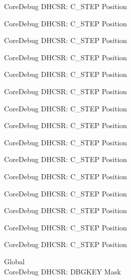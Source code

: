 \begin{DoxyRefList}
\label{deprecated__deprecated000123}%
%
Core\+Debug DHCSR\+: C\+\_\+\+STEP Position 

\label{deprecated__deprecated000179}%
%
Core\+Debug DHCSR\+: C\+\_\+\+STEP Position 

\label{deprecated__deprecated000262}%
%
Core\+Debug DHCSR\+: C\+\_\+\+STEP Position 

\label{deprecated__deprecated000321}%
%
Core\+Debug DHCSR\+: C\+\_\+\+STEP Position 

\label{deprecated__deprecated000397}%
%
Core\+Debug DHCSR\+: C\+\_\+\+STEP Position 

\label{deprecated__deprecated000486}%
%
Core\+Debug DHCSR\+: C\+\_\+\+STEP Position 

\label{deprecated__deprecated000588}%
%
Core\+Debug DHCSR\+: C\+\_\+\+STEP Position 

\label{deprecated__deprecated000713}%
%
Core\+Debug DHCSR\+: C\+\_\+\+STEP Position 

\label{deprecated__deprecated000801}%
%
Core\+Debug DHCSR\+: C\+\_\+\+STEP Position 

\label{deprecated__deprecated000857}%
%
Core\+Debug DHCSR\+: C\+\_\+\+STEP Position 

\label{deprecated__deprecated000940}%
%
Core\+Debug DHCSR\+: C\+\_\+\+STEP Position 

\label{deprecated__deprecated000999}%
%
Core\+Debug DHCSR\+: C\+\_\+\+STEP Position 

\label{deprecated__deprecated001075}%
%
Core\+Debug DHCSR\+: C\+\_\+\+STEP Position 

\label{deprecated__deprecated001164}%
%
Core\+Debug DHCSR\+: C\+\_\+\+STEP Position 

\label{deprecated__deprecated001266}%
%
Core\+Debug DHCSR\+: C\+\_\+\+STEP Position  
\item[Global \doxylink{group___c_m_s_i_s___core_debug_ga1ce997cee15edaafe4aed77751816ffc}{Core\+Debug\+\_\+\+DHCSR\+\_\+\+DBGKEY\+\_\+\+Msk} ]\hfill \\
\label{deprecated__deprecated000006}%
%
Core\+Debug DHCSR\+: DBGKEY Mask 


\end{DoxyRefList}
